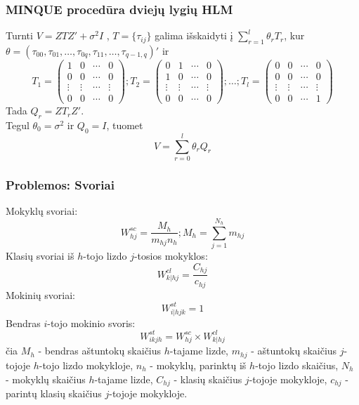 \documentclass[utf8,hyperref={unicode,pdftex}]{beamer}
\begin{document}
\begin{frame}
\frametitle{MINQUE procedūra dviejų lygių HLM}
Turnti $V=ZTZ'+\sigma^2I$ , $T=\{\tau_{ij}\}$ galima išskaidyti  į $\sum^l_{r=1}\theta_rT_r$, kur $\theta = (\tau_{00}, \tau_{01}, \dots, \tau_{0q}, \tau_{11},\dots, \tau_{q-1,q})'$ ir
\small
\[
T_1=
 \begin{pmatrix}
1&0&\cdots&0   \\
0&0&\cdots&0  \\
\vdots&\vdots&  \cdots &\vdots \\
0&0&\cdots&0
 \end{pmatrix};
T_2=
 \begin{pmatrix}
0&1&\cdots&0   \\
1&0&\cdots&0  \\
\vdots&\vdots&  \cdots &\vdots \\
0&0&\cdots&0
 \end{pmatrix};
\dots;
T_l=
 \begin{pmatrix}
0&0&\cdots&0   \\
0&0&\cdots&0  \\
\vdots&\vdots&  \cdots &\vdots \\
0&0&\cdots&1
 \end{pmatrix}
\]
Tada $Q_r= ZT_rZ'$.\\
Tegul $\theta_0 = \sigma^2$ ir $Q_0=I$, tuomet 
\large
\[V=\sum^l_{r=0} \theta_rQ_r\]

\end{frame}

\begin{frame}
\frametitle{Problemos: Svoriai}
Mokyklų svoriai: 
\begin{equation*}
W^{sc}_{hj} = \frac{M_h}{m_{hj}n_h}; M_h=\sum^{N_h}_{j=1} m_{hj}
\end{equation*}
Klasių svoriai iš $h$-tojo lizdo $j$-tosios mokyklos: 
\begin{equation*}
W^{cl}_{k|hj} = \frac{C_{hj}}{c_{hj}}
\end{equation*}
Mokinių svoriai:
\begin{equation*}
W^{st}_{i|hjk} = 1
\end{equation*}
Bendras $i$-tojo mokinio svoris:
\begin{equation}
W^{st}_{ikjh} = W^{sc}_{hj}\times W^{cl}_{k|hj}
\end{equation}
\small
čia $M_h$ - bendras aštuntokų skaičius $h$-tajame lizde, $m_{hj}$ - aštuntokų skaičius $j$-tojoje $h$-tojo lizdo mokykloje, $n_h$ - mokyklų, parinktų iš $h$-tojo lizdo skaičius, $N_h$ - mokyklų skaičius $h$-tajame lizde, $C_{hj}$ - klasių skaičius $j$-tojoje mokykloje,
$c_{hj}$ - parintų klasių skaičius $j$-tojoje mokykloje.

\end{frame}
\end{document}
